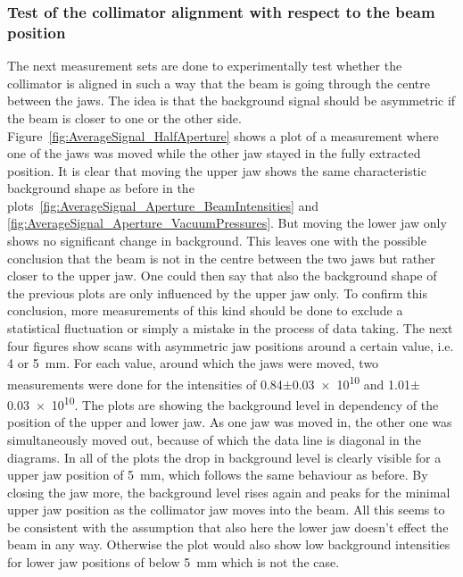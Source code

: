 \subsubsection{Test of the collimator alignment with respect to the beam position}
\label{collimator_alignment}
The next measurement sets are done to experimentally test whether the collimator is aligned in such a way that the beam is going through the centre between the jaws. The idea is that the background signal should be asymmetric if the beam is closer to one or the other side.\\Figure~\ref{fig:AverageSignal_HalfAperture} shows a plot of a measurement where one of the jaws was moved while the other jaw stayed in the fully extracted position. It is clear that moving the upper jaw shows the same characteristic background shape as before in the plots~\ref{fig:AverageSignal_Aperture_BeamIntensities} and \ref{fig:AverageSignal_Aperture_VacuumPressures}. But moving the lower jaw only shows no significant change in background. This leaves one with the possible conclusion that the beam is not in the centre between the two jaws but rather closer to the upper jaw. One could then say that also the background shape of the previous plots are only influenced by the upper jaw only. To confirm this conclusion, more measurements of this kind should be done to exclude a statistical fluctuation or simply a mistake in the process of data taking.
\newline
The next four figures show scans with asymmetric jaw positions around a certain value, i.e. 4 or \SI{5}{\milli\metre}. For each value, around which the jaws were moved, two measurements were done for the intensities of \num{0.84}$\pm$\num{0.03e10} and \num{1.01}$\pm$\num{0.03e10}. The plots are showing the background level in dependency of the position of the upper and lower jaw. As one jaw was moved in, the other one was simultaneously moved out, because of which the data line is diagonal in the diagrams. In all of the plots the drop in background level is clearly visible for a upper jaw position of \SI{5}{\milli\metre}, which follows the same behaviour as before. By closing the jaw more, the background level rises again and peaks for the minimal upper jaw position as the collimator jaw moves into the beam. All this seems to be consistent with the assumption that also here the lower jaw doesn't effect the beam in any way. Otherwise the plot would also show low background intensities for lower jaw positions of below \SI{5}{\milli\metre} which is not the case.\\

